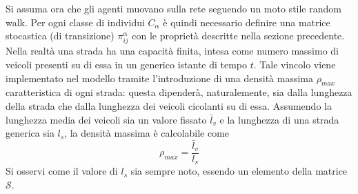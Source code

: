 \documentclass[../main.tex]{subfiles}
\begin{document}
Si assuma ora che gli agenti muovano sulla rete seguendo un moto stile random walk.
Per ogni classe di individui $C_{\alpha}$ \`e quindi necessario definire una matrice stocastica (di transizione) $\pi_{ij}^{\alpha}$ con le propriet\`a descritte nella sezione precedente.
Nella realt\`a una strada ha una capacit\`a finita, intesa come numero massimo di veicoli presenti su di essa in un generico istante di tempo $t$.
Tale vincolo viene implementato nel modello tramite l'introduzione di una densit\`a massima $\rho_{max}$ caratteristica di ogni strada: questa dipender\`a, naturalemente, sia dalla lunghezza della strada che dalla lunghezza dei veicoli cicolanti su di essa.
Assumendo la lunghezza media dei veicoli sia un valore fissato $\bar{l}_v$ e la lunghezza di una strada generica sia $l_s$, la densit\`a massima \`e calcolabile come
\begin{equation}
    \rho_{max}=\frac{\bar{l}_v}{l_s}
\end{equation}
Si osservi come il valore di $l_s$ sia sempre noto, essendo un elemento della matrice $\mathcal{S}$.
\end{document}
